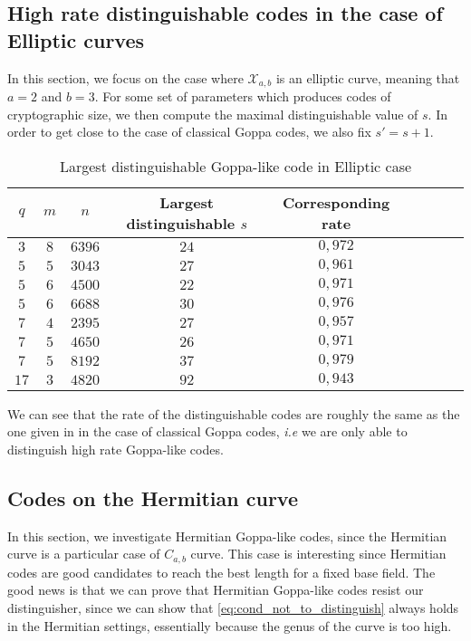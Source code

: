 \documentclass[a4paper]{article}
\theoremstyle{definition}
\theoremstyle{remark}
\newcommand{\calX}{\mathcal{X}}
\begin{document}
\subsection{High rate distinguishable codes in the case of Elliptic curves}

In this section, we focus on the case where $\calX_{a,b}$ is an elliptic curve, meaning that $a=2$ and $b=3$. For some set of parameters which produces codes of cryptographic size, we then compute the maximal distinguishable value of $s$. In order to get close to the case of classical Goppa codes, we also fix $s'=s+1$.

\begin{table}[h]
\begin{center}
\begin{tabular}{|c|c|c||c|c|c|c|c|c|}
    \hline
    $q$ & $m$ & $n$ & Largest distinguishable $s$ & Corresponding rate\\
    \hline
     $3$ & $8$ & $6396$ & $24$ & $0,972$ \\
    \hline \hline
     $5$ & $5$ & $3043$ & $27$ & $0,961$  \\
    \hline
     $5$ & $6$ & $4500$ & $22$ & $0,971$ \\
    \hline
     $5$  & $6$ & $6688$ & $30$ & $0,976$ \\
    \hline \hline
     $7$ & $4$ & $2395$ & $27$ & $0,957$ \\
    \hline
      $7$ & $5$ & $4650$ & $26$ & $0,971$ \\
    \hline
      $7$ & $5$ & $8192$ & $37$ & $0,979$ \\
    \hline \hline
      $17$ & $3$ & $4820$ & $92$ & $0,943$ \\
    \hline
\end{tabular}
\caption{Largest distinguishable Goppa-like code in Elliptic case}
\end{center}
\end{table}

We can see that the rate of the distinguishable codes are roughly the same as the one given in \cite{MT21} in the case of classical Goppa codes, \emph{i.e} we are only able to distinguish high rate Goppa-like codes.



\subsection{Codes on the Hermitian curve}

In this section, we investigate Hermitian Goppa-like codes, since the Hermitian curve is a particular case of $C_{a,b}$ curve. This case is interesting since Hermitian codes are good candidates to reach the best length for a fixed base field. The good news is that we can prove that Hermitian Goppa-like codes resist our distinguisher, since we can show that \eqref{eq:cond_not_to_distinguish} always holds in the Hermitian settings, essentially because  the genus of the curve is too high. 
\end{document}
